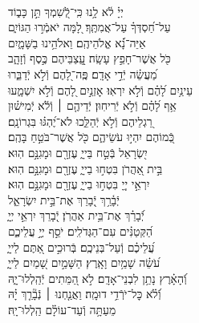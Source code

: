\documentclass[twoside, openany, parskip=half, 11pt]{book}
\begin{document}
{\begin{narrow}
\\
יְיָ֗ לֹ֫א לָ֥נוּ \hfill כִּֽי־לְֿ֭שִׁמְךָ תֵּ֣ן כָּב֑וֹד \\ עַל־חַ֝סְדְּךָ֗ עַל־אֲמִתֶּֽךָ׃ \hfill
לָ֭מָּה יֹאמְֿר֣וּ הַגּוֹיִ֑ם\\ אַיֵּה־נָ֗֝א אֱלֹהֵיהֶֽם׃ \hfill
וֵאלֹהֵ֥ינוּ בַשָּׁמָ֑יִם\\ כֹּ֖ל אֲשֶׁר־חָפֵ֣ץ עָשָֽׂה׃ \hfill
עֲֽ֭צַבֵּיהֶם כֶּ֣סֶף וְֿזָהָ֑ב\\ מַ֝עֲשֵׂ֗ה יְֿדֵ֣י אָדָֽם׃ \hfill
פֶּֽה־לָ֭הֶם וְֿלֹ֣א יְֿדַבֵּ֑רוּ\\ עֵינַ֥יִם לָ֝הֶ֗ם וְֿלֹ֣א יִרְאֽוּ׃ \hfill
אׇזְנַ֣יִם לָ֭הֶם וְֿלֹ֣א יִשְׁמָ֑עוּ\\ אַ֥ף לָ֝הֶ֗ם וְֿלֹ֣א יְֿרִיחֽוּן׃ \hfill
יְֿדֵיהֶ֤ם ׀ וְֿלֹ֬א יְֿמִישׁ֗וּן\\ רַ֭גְלֵיהֶם וְֿלֹ֣א יְֿהַלֵּ֑כוּ \hfill לֹא־יֶ֝הְגּ֗וּ בִּגְרוֹנָֽם׃ \\
כְּֿ֭מוֹהֶם יִהְי֣וּ עֹשֵׂיהֶ֑ם \hfill כֹּ֖ל אֲשֶׁר־בֹּטֵ֣חַ בָּהֶֽם׃ \\
יִ֭שְׂרָאֵל בְּֿטַ֣ח בַּייָ֑ \hfill עֶזְרָ֖ם וּמָגִנָּ֣ם הֽוּא׃ \\
בֵּ֣ית אַ֭הֲרֹן בִּטְח֣וּ בַייָ֑ \hfill עֶזְרָ֖ם וּמָגִנָּ֣ם הֽוּא׃ \\
יִרְאֵ֣י יְיָ֭ בִּטְח֣וּ בַייָ֑ \hfill עֶזְרָ֖ם וּמָגִנָּ֣ם הֽוּא׃ \\

יְֿבָ֫רֵ֥ךְ יְֿ֭בָרֵךְ \hfill אֶת־בֵּ֣ית יִשְׂרָאֵ֑ל\\ יְֿ֝בָרֵ֗ךְ אֶת־בֵּ֥ית אַהֲרֹֽן׃ \hfill
יְֿ֭בָרֵךְ יִרְאֵ֣י יְיָ֑\\ הַ֝קְּטַנִּ֗ים עִם־הַגְּדֹלִֽים׃ \hfill
יֹסֵ֣ף יְיָ֣ עֲלֵיכֶ֑ם\\ עֲ֝לֵיכֶ֗ם וְֿעַל־בְּנֵיכֶֽם׃ \hfill
בְּֿרוּכִ֣ים אַ֭תֶּם לַייָ֑\\ עֹ֝שֵׂ֗ה שָׁמַ֥יִם וָאָֽרֶץ׃ \hfill
הַשָּׁמַ֣יִם שָׁ֭מַיִם לַייָ֑\\ וְֿ֝הָאָ֗רֶץ נָתַ֥ן לִבְנֵי־אָדָֽם׃ \hfill
לֹ֣א הַ֭מֵּתִים יְֿהַֽלְלוּ־יָ֑הּ\\ וְֿ֝לֹ֗א כׇּל־יֹרְֿדֵ֥י דוּמָֽה׃ \hfill
וַאֲנַ֤חְנוּ ׀ נְֿבָ֘רֵ֤ךְ יָ֗הּ\\ מֵעַתָּ֥ה וְֿעַד־עוֹלָ֗ם הַֽלְלוּ־יָֽהּ׃ \hfill \break



\end{narrow}}
\end{document}

